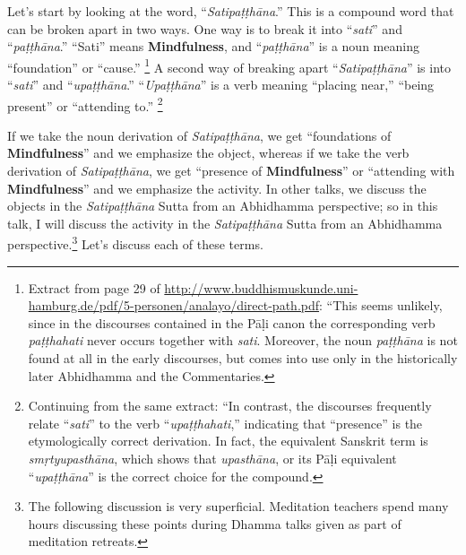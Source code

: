 Let’s start by looking at the word, “\textit{Satipaṭṭhāna}.” This is a compound word that can be broken apart in two ways. One way is to break it into “\textit{sati}” and “\textit{paṭṭhāna}.” “Sati” means \textbf{Mindfulness}, and “\textit{paṭṭhāna}” is a noun meaning “foundation” or “cause.” \footnote{Extract from page 29 of \url{http://www.buddhismuskunde.uni-hamburg.de/pdf/5-personen/analayo/direct-path.pdf}: “This seems unlikely, since in the discourses contained in the Pāḷi canon the corresponding verb \textit{paṭṭhahati} never occurs together with \textit{sati}. Moreover, the noun \textit{paṭṭhāna} is not found at all in the early discourses, but comes into use only in the historically later Abhidhamma and the Commentaries.} A second way of breaking apart “\textit{Satipaṭṭhāna}” is into “\textit{sati}” and “\textit{upaṭṭhāna}.” “\textit{Upaṭṭhāna}” is a verb meaning “placing near,” “being present” or “attending to.” \footnote{Continuing from the same extract: “In contrast, the discourses frequently relate “\textit{sati}” to the verb “\textit{upaṭṭhahati},” indicating that “presence” is the etymologically correct derivation. In fact, the equivalent Sanskrit term is \textit{smṛtyupasthāna}, which shows that \textit{upasthāna}, or its Pāḷi equivalent “\textit{upaṭṭhāna}” is the correct choice for the compound.}

If we take the noun derivation of \textit{Satipaṭṭhāna}, we get “foundations of \textbf{Mindfulness}” and we emphasize the object, whereas if we take the verb derivation of \textit{Satipaṭṭhāna}, we get “presence of \textbf{Mindfulness}” or “attending with \textbf{Mindfulness}” and we emphasize the activity. In other talks, we discuss the objects in the \textit{Satipaṭṭhāna} Sutta from an Abhidhamma perspective; so in this talk, I will discuss the activity in the \textit{Satipaṭṭhāna} Sutta from an Abhidhamma perspective.\footnote{The following discussion is very superficial. Meditation teachers spend many hours discussing these points during Dhamma talks given as part of meditation retreats.} Let’s discuss each of these terms.

